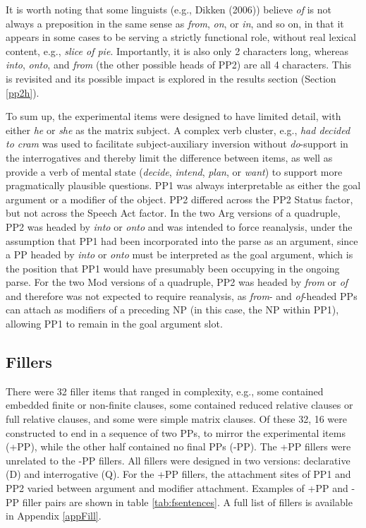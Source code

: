 \documentclass[11pt,oneside]{book}
\begin{document}
It is worth noting that some linguists (e.g., Dikken (2006)) believe \emph{of} is not always a preposition in the same sense as \emph{from}, \emph{on}, or \emph{in}, and so on, in that it appears in some cases to be serving a strictly functional role, without real lexical content, e.g., \emph{slice of pie}. Importantly, it is also only 2 characters long, whereas \emph{into}, \emph{onto}, and \emph{from} (the other possible heads of PP2) are all 4 characters. This is revisited and its possible impact is explored in the results section (Section \ref{pp2h}).

To sum up, the experimental items were designed to have limited detail, with either \emph{he} or \emph{she} as the matrix subject. A complex verb cluster, e.g., \emph{had decided to cram} was used to facilitate subject-auxiliary inversion without \emph{do}-support in the interrogatives and thereby limit the difference between items, as well as provide a verb of mental state (\emph{decide}, \emph{intend}, \emph{plan}, or \emph{want}) to support more pragmatically plausible questions. PP1 was always interpretable as either the goal argument or a modifier of the object. PP2 differed across the PP2 Status factor, but not across the Speech Act factor. In the two Arg versions of a quadruple, PP2 was headed by \emph{into} or \emph{onto} and was intended to force reanalysis, under the assumption that PP1 had been incorporated into the parse as an argument, since a PP headed by \emph{into} or \emph{onto} must be interpreted as the goal argument, which is the position that PP1 would have presumably been occupying in the ongoing parse. For the two Mod versions of a quadruple, PP2 was headed by \emph{from} or \emph{of} and therefore was not expected to require reanalysis, as \emph{from}- and \emph{of}-headed PPs can attach as modifiers of a preceding NP (in this case, the NP within PP1), allowing PP1 to remain in the goal argument slot.

\hypertarget{fillers}{%
\subsection{Fillers}\label{fillers}}

There were 32 filler items that ranged in complexity, e.g., some contained embedded finite or non-finite clauses, some contained reduced relative clauses or full relative clauses, and some were simple matrix clauses. Of these 32, 16 were constructed to end in a sequence of two PPs, to mirror the experimental items (+PP), while the other half contained no final PPs (-PP). The +PP fillers were unrelated to the -PP fillers. All fillers were designed in two versions: declarative (D) and interrogative (Q). For the +PP fillers, the attachment sites of PP1 and PP2 varied between argument and modifier attachment. Examples of +PP and -PP filler pairs are shown in table \ref{tab:fsentences}. A full list of fillers is available in Appendix \ref{appFill}.
\end{document}
